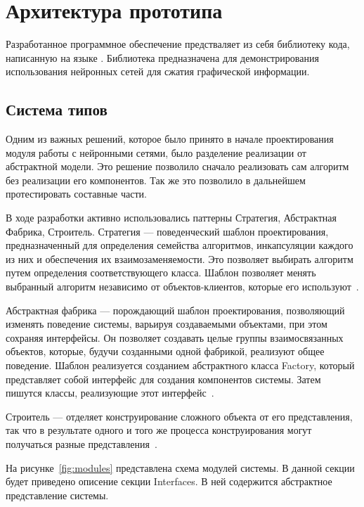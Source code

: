 \section{Архитектура прототипа}
\label{sec:development}

Разработанное программное обеспечение предстваляет из себя библиотеку кода,
написанную на языке \csharp{}. Библиотека предназначена для демонстрирования
использования нейронных сетей для сжатия графической информации.

\subsection{Система типов}
\label{sub:development:types}

Одним из важных решений, которое было принято в начале проектирования модуля работы
с нейронными сетями, было разделение реализации от абстрактной модели. Это решение
позволило сначало реализовать сам алгоритм без реализации его компонентов. Так же это позволило в дальнейшем протестировать составные части.

В ходе разработки активно использовались паттерны Стратегия, Абстрактная Фабрика, Строитель.
Стратегия --- поведенческий шаблон проектирования, предназначенный для определения семейства алгоритмов,
инкапсуляции каждого из них и обеспечения их взаимозаменяемости. Это позволяет выбирать алгоритм путем
определения соответствующего класса. Шаблон позволяет менять выбранный алгоритм независимо от объектов-клиентов, которые его используют~\cite{development_patterns}.

Абстрактная фабрика --- порождающий шаблон проектирования, позволяющий изменять поведение системы,
варьируя создаваемыми объектами, при этом сохраняя интерфейсы. Он позволяет создавать целые группы
взаимосвязанных объектов, которые, будучи созданными одной фабрикой, реализуют общее поведение.
Шаблон реализуется созданием абстрактного класса Factory, который представляет собой интерфейс для
создания компонентов системы. Затем пишутся классы, реализующие этот интерфейс~\cite{development_patterns}.

Строитель --- отделяет конструирование сложного объекта от его представления,
так что в результате одного и того же процесса конструирования могут получаться разные представления~\cite{development_patterns}.

На рисунке~\ref{fig:modules} представлена схема модулей системы.
В данной секции будет приведено описение секции Interfaces. В ней содержится абстрактное представление
системы.

